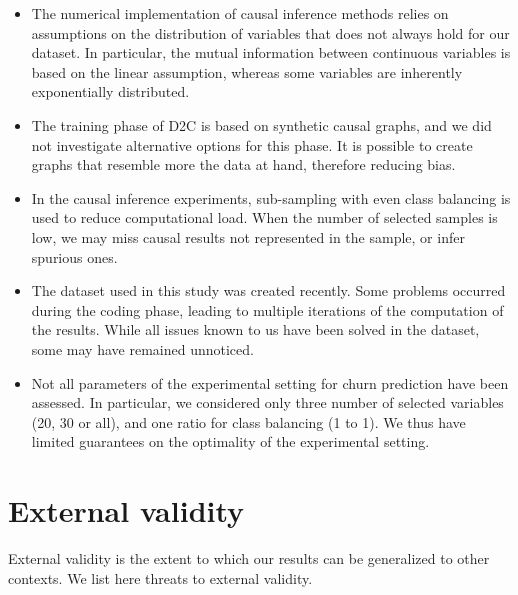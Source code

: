 \begin{itemize}
	\item The numerical implementation of causal inference methods relies on
	assumptions on the distribution of variables that does not always hold for
	our dataset. In particular, the mutual information between continuous
	variables is based on the linear assumption, whereas some variables are
	inherently exponentially distributed.

	\item The training phase of D2C is based on synthetic causal graphs, and we
	did not investigate alternative options for this phase. It is possible to
	create graphs that resemble more the data at hand, therefore reducing bias.

	\item In the causal inference experiments, sub-sampling with even class
	balancing is used to reduce computational load. When the number of selected
	samples is low, we may miss causal results not represented in the sample, or
	infer spurious ones.

	\item The dataset used in this study was created recently. Some problems
	occurred during the coding phase, leading to multiple iterations of the
	computation of the results. While all issues known to us have been solved
	in the dataset, some may have remained unnoticed.

	\item Not all parameters of the experimental setting for churn prediction
	have been assessed. In particular, we considered only three number of
	selected variables (20, 30 or all), and one ratio for class balancing (1 to
	1). We thus have limited guarantees on the optimality of the experimental
	setting.

\end{itemize}

\section{External validity}
\label{sec:ext_val}

External validity is the extent to which our results can be generalized to other
contexts. We list here threats to external validity.

